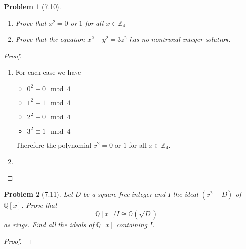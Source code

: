 \documentclass[10pt]{article}
\newcommand{\sk}{\vskip 10mm}
\newcommand{\bb}[1]{\mathbb{#1}}
\theoremstyle{plain}
\newtheorem{problem}{Problem}
\theoremstyle{remark}
\begin{document}
\sk

\begin{problem}[7.10]
  \begin{enumerate}
  \item Prove that $x^2=0$ or $1$ for all $x\in\bb{Z}_4$
  \item Prove that the equation $x^2+y^2=3z^2$ has no nontrivial
    integer solution.
  \end{enumerate}
\end{problem}

\begin{proof}
  \begin{enumerate}
  \item For each case we have
    \begin{itemize}
    \item $0^2\equiv 0 \mod 4$
    \item $1^2\equiv 1 \mod 4$
    \item $2^2\equiv 0 \mod 4$
    \item $3^2\equiv 1 \mod 4$
    \end{itemize}
    Therefore the polynomial $x^2=0$ or $1$ for all $x\in\bb{Z}_4$.
  \item
  \end{enumerate}
\end{proof}

\sk

\begin{problem}[7.11]
  Let $D$ be a square-free integer and $I$ the ideal $(x^2-D)$ of $\bb{Q}[x]$.
  Prove that
  \[ \bb{Q}[x]/I\cong\bb{Q}(\sqrt{D}) \]
  as rings. Find all the ideals of $\bb{Q}[x]$ containing $I$.
\end{problem}

\begin{proof}
  
\end{proof}

\end{document}
